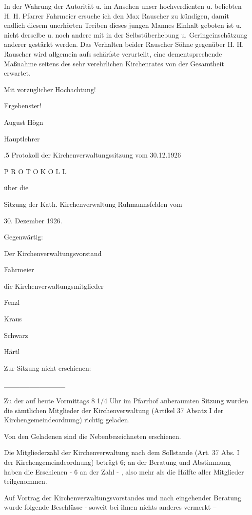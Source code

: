 \documentclass[12pt,a4pager]{book}
\begin{document}
In der Wahrung der Autorität u. im Ansehen unser hochverdienten u. beliebten H.
H. Pfarrer Fahrmeier ersuche ich den Max Rauscher zu kündigen, damit endlich
diesem unerhörten Treiben dieses jungen Mannes Einhalt geboten ist u. nicht
derselbe u. noch andere mit in der Selbstüberhebung u. Geringeinschätzung
anderer gestärkt werden. Das Verhalten beider Rauscher Söhne gegenüber H. H.
Rauscher wird allgemein aufs schärfste verurteilt, eine dementsprechende
Maßnahme seitens des sehr verehrlichen Kirchenrates von der Gesamtheit erwartet.



    Mit vorzüglicher Hochachtung!

        Ergebenster!

            August Högn

                Hauptlehrer

.5 Protokoll der Kirchenverwaltungssitzung vom 30.12.1926

P R O T O K O L L

über die

Sitzung der Kath. Kirchenverwaltung Ruhmannsfelden vom

30. Dezember 1926.



Gegenwärtig:

Der Kirchenverwaltungsvorstand

Fahrmeier

die Kirchenverwaltungsmitglieder

Fenzl

Kraus

Schwarz

Härtl

Zur Sitzung nicht erschienen:

____________

Zu der auf heute Vormittags 8 1/4 Uhr im Pfarrhof anberaumten Sitzung wurden die
sämtlichen Mitglieder der Kirchenverwaltung (Artikel 37 Absatz I der
Kirchengemeindeordnung) richtig geladen.

Von den Geladenen sind die Nebenbezeichneten erschienen.

Die Mitgliederzahl der Kirchenverwaltung nach dem Sollstande (Art. 37 Abs. I der
Kirchengemeindeordnung) beträgt 6; an der Beratung und Abstimmung haben die
Erschienen - 6 an der Zahl - , also mehr als die Hälfte aller Mitglieder
teilgenommen.

Auf Vortrag der Kirchenverwaltungsvorstandes und nach eingehender Beratung wurde
folgende Beschlüsse - soweit bei ihnen nichts anderes vermerkt –
\end{document}
